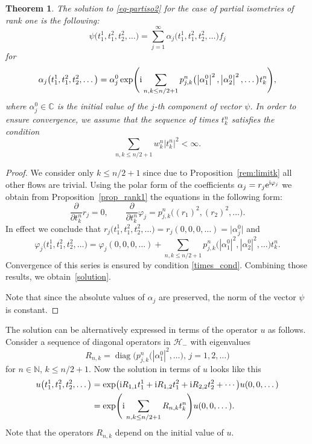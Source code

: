 \documentclass[10pt,a4paper]{amsart}
\newtheorem{thm}{Theorem}[section]
\theoremstyle{definition}
\numberwithin{equation}{section}
\newcommand{\C}{\mathbb C}
\newcommand{\N}{\mathbb N}
\renewcommand{\H}{\mathcal{H}}
\newcommand{\abs}[1]{\left\vert#1\right\vert}
\newcommand{\be}{\begin{equation}}
\newcommand{\ee}{\end{equation}}
\begin{document}
\begin{thm}\label{thm-rank1}
The solution to \eqref{eq-partiso2} for the case of partial isometries of rank one is the following:
\[\psi\bigl(t_1^1,t_1^2,t_2^2,\dots\bigr) = \sum_{j=1}^\infty \alpha_j\bigl(t_1^1,t_1^2,t_2^2,\dots\bigr) f_j\]
for
\begin{equation}\label{solution}
\alpha_j\bigl(t_1^1,t_1^2,t_2^2,\dots\bigr) = \alpha_j^0 \exp\Biggl({{\rm i} \sum_{n,k\leq n/2+1} p_{j,k}^n\bigl(\abs{\alpha_1^0}^2,\abs{\alpha_2^0}^2,\dots\bigr)t^n_k}\Biggr),
\end{equation}
where $\alpha_j^0\in\C$ is the initial value of the $j$-th component of vector $\psi$. In order to ensure convergence, we assume that the sequence of times $t^n_k$ satisfies the condition
\be \label{times_cond} \sum_{n,k\leq n/2+1} w^n_k \abs{t^n_k}^2 < \infty. \ee
\end{thm}
\begin{proof}We consider only $k\leq n/2+1$ since due to Proposition~\ref{rem:limitk} all other flows are trivial.
Using the polar form of the coefficients
$\alpha_j = r_j {\rm e}^{{\rm i}\varphi_j}$
we obtain from Proposition~\ref{prop_rank1} the equations in the following form:
\[
 \frac\partial{\partial t^n_k} r_j = 0 ,\qquad
 \frac\partial{\partial t^n_k} \varphi_j = p_{j,k}^n\bigl((r_1)^2,(r_2)^2,\dots\bigr).
\]
In effect we conclude that
$r_j\bigl(t_1^1,t_1^2,t_2^2,\dots\bigr) = r_j(0, 0, 0, \dots) = \bigl|\alpha_j^0\bigr|$
and
\[\varphi_j\bigl(t_1^1,t_1^2,t_2^2,\dots\bigr)
= \varphi_j(0, 0, 0, \dots) + \sum\limits_{{n,k\leq n/2+1}} p_{j,k}^n\bigl(|\alpha_1^0|^2,|\alpha_2^0|^2,\dots\bigr)t^n_k.\]
Convergence of this series is ensured by condition \eqref{times_cond}.
Combining those results, we obtain~\eqref{solution}.

Note that since the absolute values of $\alpha_j$ are preserved, the norm of the vector $\psi$ is constant.
\end{proof}

The solution can be alternatively expressed in terms of the operator $u$ as follows. Consider a sequence of diagonal operators in $\H_-$ with eigenvalues
\[
R_{n,k}=\operatorname{diag}\bigl(
p_{j,k}^n\bigl(\abs{\alpha_1^0}^2,\dots\bigr),\, j=1,2,\dots\bigr)
\]
for $n\in\N$, $k\leq n/2+1$.
Now the solution in terms of $u$ looks like this
\begin{align*}
u\bigl(t_1^1,t_1^2,t_2^2,\dots\bigr)&= \exp\bigl({\rm i}R_{1,1}{t_1^1}+
{\rm i}R_{1,2}{t_1^2}+{\rm i}R_{2,2}{t_2^2}+\cdots\bigr) u(0,0,\dots)\\
& =\exp\Biggl({{\rm i}\sum\limits_{{n,k\leq n/2+1}} R_{n,k}t^n_k}\Biggr)u(0,0,\dots). \end{align*}
Note that the operators $R_{n,k}$ depend on the initial value of $u$.
\end{document}
